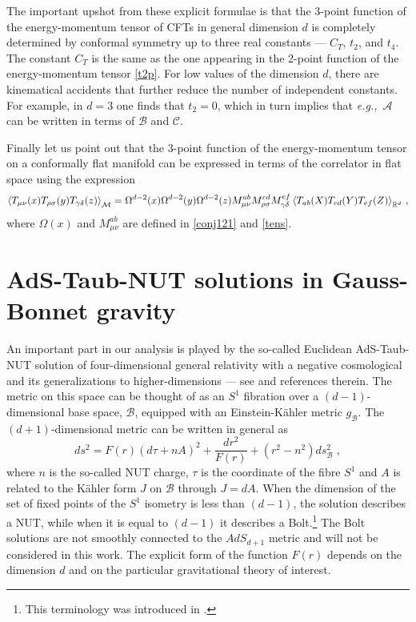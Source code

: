 \documentclass[12pt]{article}
\numberwithin{equation}{section}
\newcommand{\ssc}{\scriptscriptstyle}
\newcommand{\eg}{{\it e.g.,}\ }
\newcommand{\ctt}{C_{\ssc T}}
\begin{document}
The important upshot from these explicit formulae is that the 3-point function of the energy-momentum tensor of CFTs in general dimension $d$ is completely determined by conformal symmetry up to three real constants --- $\ctt$, $t_2$, and $t_4$. The constant $\ctt$ is the same as the one appearing in the 2-point function of the energy-momentum tensor \eqref{t2p}. For low values of the dimension $d$, there are kinematical accidents that further reduce the number of independent constants. For example, in $d=3$ one finds that $t_2=0$, which in turn implies that \eg $\mathcal{A}$ can be written in terms of $\mathcal{B}$ and $\mathcal{C}$. 


Finally let us point out that the 3-point function of the energy-momentum tensor on a conformally flat manifold can be expressed in terms of the correlator in flat space using the expression
%
\begin{equation}
\braket{T_{\mu\nu}(x)T_{\rho\sigma}(y)T_{\gamma\delta}(z)}_{\mathcal{M}}=\Omega^{d-2}(x)\Omega^{d-2}(y)\Omega^{d-2}(z) M_{\mu\nu}^{ab}M_{\rho\sigma}^{cd}M_{\gamma\delta}^{ef}\braket{T_{ab}(X)T_{cd}(Y)T_{ef}(Z)}_{\mathbb{R}^d}\,,
\end{equation}
%
where $\Omega(x)$ and $M_{\mu\nu}^{ab}$ are defined in \eqref{conj121} and \eqref{tens}.

\section{AdS-Taub-NUT solutions in Gauss-Bonnet gravity}
\label{TNn}

An important part in our analysis is played by the so-called Euclidean AdS-Taub-NUT solution of four-dimensional general relativity with a negative cosmological and its generalizations to higher-dimensions --- see \cite{Hawking:1998ct,Emparan:1999pm} and references therein. The metric on this space can be thought of as an $S^1$ fibration over a $(d-1)$-dimensional base space, $\mathcal{B}$, equipped with an Einstein-K\"ahler metric $g_{\mathcal{B}}$. The $(d+1)$-dimensional metric can be written in general as
%
\begin{equation}\label{TN1}
ds^2 = F(r)\left(d\tau + n A\right)^2+\frac{dr^2}{F(r)}+(r^2-n^2)ds_{\mathcal{B}}^2\;,
\end{equation}
%
where $n$ is the so-called NUT charge, $\tau$ is the coordinate of the fibre $S^1$ and $A$ is related to the K\"ahler form $J$ on $\mathcal{B}$ through $J=dA$. When the dimension of the set of fixed points of the $S^1$ isometry is less than $(d-1)$, the solution describes a NUT, while when it is equal to $(d-1)$ it describes a Bolt.\footnote{This terminology was introduced in \cite{Gibbons:1979xm}.} The Bolt solutions are not smoothly connected to the $AdS_{d+1}$ metric and will not be considered in this work. The explicit form of the function $F(r)$ depends on the dimension $d$ and on the particular gravitational theory of interest.
\end{document}
